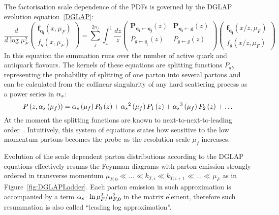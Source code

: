 The factorisation scale dependence of the PDFs is governed by the DGLAP evolution equation~\ref{DGLAP}:
\begin{equation}
\frac{d}{d\log{\mu_F^2}}
 \begin{pmatrix}
	\mathbf{f_{q_i}}\left(x,\mu_F\right) \\
	f_g\left(x,\mu_F\right)
 \end{pmatrix} = 
\sum_j^{2n_f}{\int_x^1{\frac{dz}{z}
 \begin{pmatrix}
  \mathbf{P_{q_i \leftarrow q_j}}\left(z\right) & \mathbf{P_{q_i \leftarrow  g}}\left(z\right) \\
  P_{g \leftarrow q_j}\left(z\right) & P_{g \leftarrow g}\left(z\right) \\
 \end{pmatrix}
 \begin{pmatrix}
	\mathbf{f_{q_j}}\left(x/z,\mu_F\right) \\
	f_g\left(x/z,\mu_F\right)
 \end{pmatrix}
}}
\end{equation}
In this equation the summation runs over the number of active quark and antiquark flavours. The kernels of these equations are splitting functions $P_{ab}$ representing the probability of splitting of one parton into several partons and can be calculated from the collinear singularity of any hard scattering process as a power series in $\mbox{$\alpha_{s}$}$:
\begin{equation}
P\left(z,\mbox{$\alpha_{s}$}\left(\mu_f\right)\right) = \mbox{$\alpha_{s}$}\left(\mu_f\right) P_0\left(z\right) + \mbox{$\alpha_{s}$}^2\left(\mu_f\right)P_1\left(z\right) + \mbox{$\alpha_{s}$}^3\left(\mu_f\right)P_2\left(z\right) + \ldots
\label{eq:splittingfunc}
\end{equation}
At the moment the splitting functions are known to next-to-next-to-leading order~\cite{nnlosplittingfinctions}. Intuitively, this system of equations states how sensitive to the low momentum partons becomes the probe as the resolution scale $\mu_f$ increases. %

Evolution of the scale dependent parton distributions according to the DGLAP equations effectively resums the Feynman diagrams with parton emission strongly ordered in transverse momentum $ \mu_{F,0} \ll \ldots \ll k_{T,i} \ll k_{T,i+1} \ll \ldots \ll \mu_F$ as in Figure~\ref{fig:DGLAPLadder}. Each parton emission in such approximation is accompanied by a term $\mbox{$\alpha_{s}$}\cdot\ln{\mu^2_F/\mu^2_{F,0}}$ in the matrix element, therefore such resummation is also called ``leading log approximation''.

